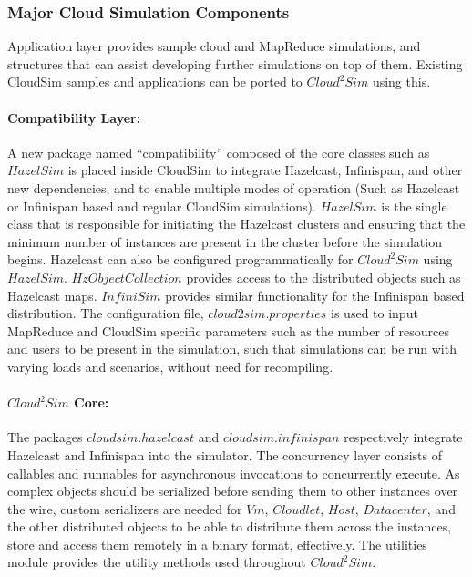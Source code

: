 \subsubsection{Major Cloud Simulation Components}
Application layer provides sample cloud and MapReduce simulations, and structures that can assist developing further simulations on top of them. Existing CloudSim samples and applications can be ported to $Cloud^{2}Sim$ using this. 

\paragraph*{Compatibility Layer:}
A new package named ``compatibility'' composed of the core classes such as $HazelSim$ is placed inside CloudSim to integrate Hazelcast, Infinispan, and other new dependencies, and to enable multiple modes of operation (Such as Hazelcast or Infinispan based and regular CloudSim simulations). $HazelSim$ is the single class that is responsible for initiating the Hazelcast clusters and ensuring that the minimum number of instances are present in the cluster before the simulation begins. Hazelcast can also be configured programmatically for $Cloud^{2}Sim$ using $HazelSim$. $HzObjectCollection$ provides access to the distributed objects such as Hazelcast maps. $InfiniSim$ provides similar functionality for the Infinispan based distribution. The configuration file, $cloud2sim.properties$ is used to input MapReduce and CloudSim specific parameters such as the number of resources and users to be present in the simulation, such that simulations can be run with varying loads and scenarios, without need for recompiling.

\paragraph*{$Cloud^{2}Sim$ Core:}
The packages $cloudsim.hazelcast$ and $cloudsim.infinispan$ respectively integrate Hazelcast and Infinispan into the simulator. The concurrency layer consists of callables and runnables for asynchronous invocations to concurrently execute. As complex objects should be serialized before sending them to other instances over the wire, custom serializers are needed for $Vm$, $Cloudlet$, $Host$, $Datacenter$, and the other distributed objects to be able to distribute them across the instances, store and access them remotely in a binary format, effectively. The utilities module provides the utility methods used throughout $Cloud^{2}Sim$.

